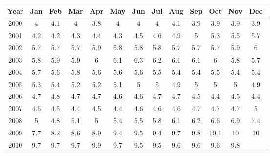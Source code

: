 \hspace{-.7in}
\begin{tabular}{|c|c|c|c|c|c|c|c|c|c|c|c|c|}
\hline
Year&	Jan&		Feb&		Mar&		Apr&		May&		Jun	&	Jul&		Aug	&	Sep	&	Oct&		Nov	&	Dec\\ \hline
2000&		4&		4.1&		4&		3.8&		4&		4&		4&		4.1&		3.9&		3.9&		3.9&		3.9\\ \hline
2001&		4.2&		4.2&		4.3&		4.4&		4.3&		4.5&		4.6&		4.9&		5&		5.3&		5.5	&	5.7\\ \hline
2002&		5.7&		5.7&		5.7&		5.9&		5.8&		5.8&		5.8&		5.7&		5.7	&	5.7&		5.9&		6\\ \hline
2003&		5.8&		5.9&		5.9&		6&		6.1&		6.3&		6.2&		6.1&		6.1	&	6&		5.8	&	5.7\\ \hline
2004&		5.7&		5.6&		5.8&		5.6&		5.6&		5.6&		5.5&		5.4&		5.4	&	5.5	&	5.4&		5.4\\ \hline
2005&		5.3&		5.4&		5.2&		5.2&		5.1&		5&		5&		4.9&		5	&	5&		5&		4.9\\ \hline
2006&		4.7&		4.8&		4.7	&	4.7&		4.6&		4.6&		4.7&		4.7&		4.5	&	4.4	&	4.5	&	4.4\\ \hline
2007&		4.6&		4.5&		4.4&		4.5&		4.4&		4.6&		4.6&		4.6&		4.7	&	4.7&		4.7&		5\\ \hline
2008&		5	&	4.8&		5.1	&	5&	5.4&		5.5&		5.8&		6.1&		6.2&		6.6&		6.9&		7.4\\ \hline
2009&		7.7&		8.2&		8.6	&	8.9&		9.4&		9.5&		9.4&		9.7&		9.8&		10.1&		10&		10\\ \hline
2010&		9.7&		9.7&		9.7	&	9.9&		9.7&		9.5&		9.5&		9.6&		9.6&		9.6&		9.8	 &	\\
\hline
\end{tabular}




%
%
